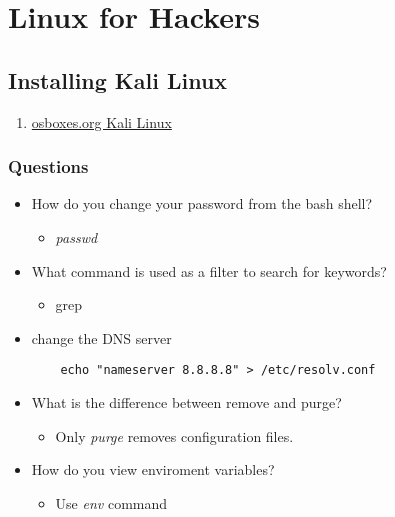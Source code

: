 \documentclass[12pt,letterpaper]{article}
\begin{document}
\section{Linux for Hackers}
\subsection{Installing Kali Linux} 
\begin{enumerate}
    \item \href{https://www.osboxes.org/kali-linux/}{osboxes.org Kali Linux}
\end{enumerate}
\subsubsection{Questions}
\begin{itemize}
    \item How do you change your password from the bash shell? 
    \begin{itemize}
        \item \textit{passwd}
    \end{itemize}
    \item What command is used as a filter to search for keywords? 
    \begin{itemize}
        \item grep
    \end{itemize}
    \item change the DNS server 
    \begin{lstlisting}
    echo "nameserver 8.8.8.8" > /etc/resolv.conf
    \end{lstlisting}
    \item What is the difference between remove and purge? 
    \begin{itemize}
        \item Only \textit{purge} removes configuration files. 
    \end{itemize}
    \item How do you view enviroment variables? 
    \begin{itemize}
        \item Use \textit{env} command
    \end{itemize}
\end{itemize}
\end{document}
